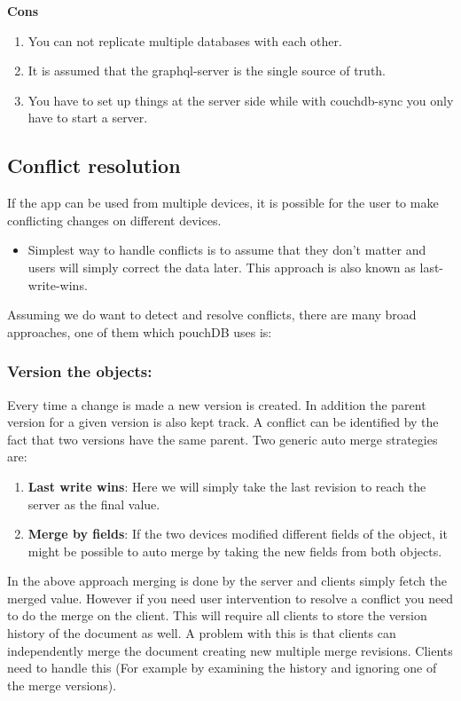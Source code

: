 \textbf{Cons}
\begin{enumerate}
    \item You can not replicate multiple databases with each other.
    \item It is assumed that the graphql-server is the single source of truth.
    \item You have to set up things at the server side while with couchdb-sync 
    you only have to start a server.~\cite{RxDBreplication}
\end{enumerate}


\subsection{Conflict resolution}
If the app can be used from multiple devices, it is possible for the user to make 
conflicting changes on different devices.

\begin{itemize}
    \item Simplest way to handle conflicts is to assume that they don’t matter and 
    users will simply correct the data later. This approach is also known as last-write-wins.
\end{itemize}

Assuming we do want to detect and resolve conflicts, there are many broad approaches, 
one of them which pouchDB uses is:

\subsubsection{Version the objects:}

Every time a change is made a new version is created. In addition the parent version for a given 
version is also kept track. A conflict can be identified by the fact that two versions have the 
same parent. Two generic auto merge strategies are:

\begin{enumerate}
    \item \textbf{Last write wins}: Here we will simply take the last revision to 
    reach the server as the final value.
    \item \textbf{Merge by fields}: If the two devices modified different fields 
    of the object, it might be possible to auto merge by taking the new fields from both objects.
\end{enumerate}

In the above approach merging is done by the server and clients simply fetch the merged value. 
However if you need user intervention to resolve a conflict you need to do the merge on the client.
This will require all clients to store the version history of the document as well. A problem with this 
is that clients can independently merge the document creating new multiple merge revisions.
Clients need to handle this (For example by examining the history and ignoring one of the merge versions).

